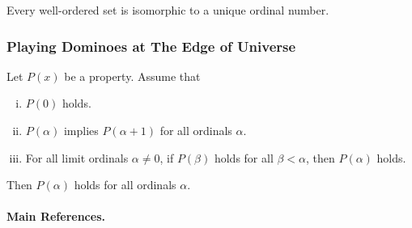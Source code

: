\begin{theorem} \label{thm-counting}
	Every well-ordered set is isomorphic to a unique ordinal number.
\end{theorem}

\subsubsection{Playing Dominoes at The Edge of Universe}
\begin{theorem} \label{thm-trans-induction}
	Let $P(x)$ be a property. Assume that
	\begin{enumerate}[(i)]
		\item $P(0)$ holds.
		\item $P(\alpha)$ implies $P(\alpha + 1)$ for all ordinals $\alpha$.
		\item For all limit ordinals $\alpha \ne 0$, if $P(\beta)$ holds for all $\beta < \alpha$, then $P(\alpha)$ holds.
	\end{enumerate}
	Then $P(\alpha)$ holds for all ordinals $\alpha$.
\end{theorem}



\paragraph{Main References.} \cite{Roman2008,Halmos1974,Jech2003,Osborne2000,Hungerford1974}




